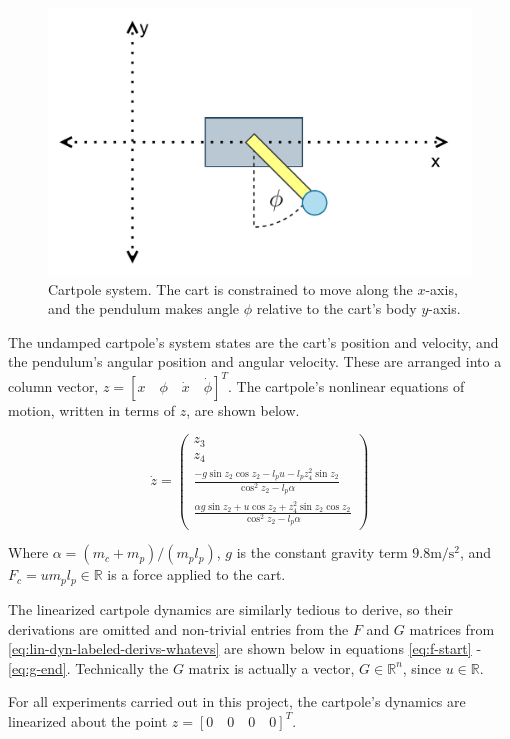 \documentclass{exam}
\begin{document}
\begin{multicols}{2}
\begin{figure}[H]
    \centering
    \includegraphics[width=1.0\linewidth]{cartpole.drawio.png}
    \caption{Cartpole system. The cart is constrained to move along the $x$-axis, and the pendulum makes angle $\phi$ relative to the cart's body $y$-axis.}
    \label{fig:cartpole}
\end{figure}

The undamped cartpole's system states are the cart's position and velocity, and the pendulum's angular position and angular velocity. These are arranged into a column vector, $z = [x \quad \phi \quad \dot{x} \quad \dot{\phi}]^T$. The cartpole's nonlinear equations of motion, written in terms of $z$, are shown below.

\begin{equation}
    \label{eq:nonlin-cartpole-dynamics}
    \dot{z}
    = \begin{pmatrix}
        z_3 \\
        z_4 \\
        \frac{ -g\sin{z_2}\cos{z_2} - l_p u - l_p z_4^2\sin{z_2} }{\cos^2{z_2} - l_p \alpha}\\
        \frac{ \alpha g\sin{z_2} + u\cos{z_2} + z_4^2\sin{z_2}\cos{z_2}} {\cos^2{z_2} - l_p \alpha}
    \end{pmatrix}
\end{equation}

Where $\alpha = (m_c + m_p)/(m_p l_p)$, $g$ is the constant gravity term $9.8 \textrm{m}/\textrm{s}^2$, and $F_c = u m_p l_p \in \mathbb{R}$ is a force applied to the cart.

The linearized cartpole dynamics are similarly tedious to derive, so their derivations are omitted and non-trivial entries from the $F$ and $G$ matrices from \eqref{eq:lin-dyn-labeled-derivs-whatevs} are shown below in equations \eqref{eq:f-start} - \eqref{eq:g-end}. Technically the $G$ matrix is actually a vector, $G \in \mathbb{R}^n$, since $u \in \mathbb{R}$.

For all experiments carried out in this project, the cartpole's dynamics are linearized about the point $z = [0 \quad 0 \quad 0 \quad 0]^T$.

\end{multicols}
\end{document}
